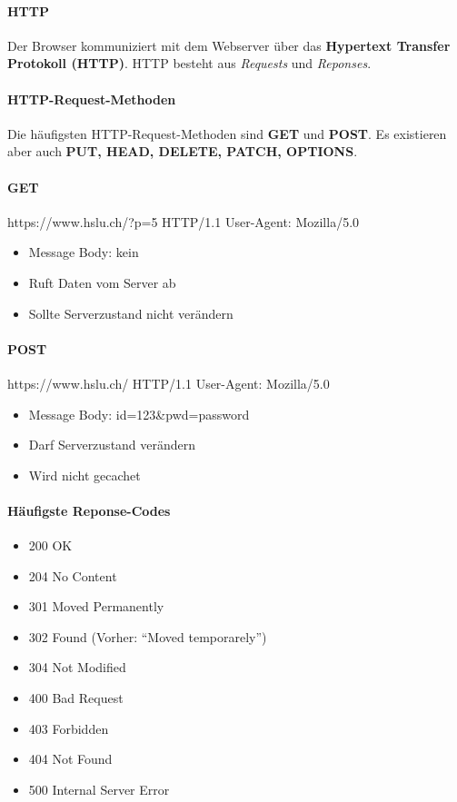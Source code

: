 \documentclass[10pt,a4paper]{article}
\begin{document}
\paragraph*{HTTP}Der Browser kommuniziert mit dem Webserver über das \textbf{Hypertext Transfer Protokoll (HTTP)}. HTTP besteht aus \textsl{Requests} und \textsl{Reponses}.
\paragraph*{HTTP-Request-Methoden}Die häufigsten HTTP-Request-Methoden sind \textbf{GET} und \textbf{POST}.
Es existieren aber auch \textbf{PUT, HEAD, DELETE, PATCH, OPTIONS}.
\paragraph*{GET} https://www.hslu.ch/?p=5 HTTP/1.1 User-Agent: Mozilla/5.0
\begin{itemize}[noitemsep,topsep=0pt,leftmargin=*]
    \item Message Body: kein
    \item Ruft Daten vom Server ab
    \item Sollte Serverzustand nicht verändern
\end{itemize}
\paragraph*{POST}https://www.hslu.ch/ HTTP/1.1 User-Agent: Mozilla/5.0
\begin{itemize}[noitemsep,topsep=0pt,leftmargin=*]
    \item Message Body: id=123\&pwd=password
    \item Darf Serverzustand verändern
    \item Wird nicht gecachet
\end{itemize}
\paragraph*{Häufigste Reponse-Codes}
\begin{itemize}[noitemsep,topsep=0pt,leftmargin=*]
    \item 200 OK
    \item 204 No Content
    \item 301 Moved Permanently
    \item 302 Found (Vorher: "`Moved temporarely"')
    \item 304 Not Modified
    \item 400 Bad Request
    \item 403 Forbidden
    \item 404 Not Found
    \item 500 Internal Server Error
\end{itemize}
\end{document}
